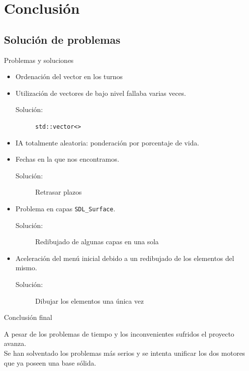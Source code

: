 \documentclass[9pt,xcolor=svgnames]{beamer}
\begin{document}
  


 \section{Conclusión}
 
  \subsection{Solución de problemas}

  \begin{frame}{Problemas y soluciones}
   \transdissolve

   \begin{itemize}
    \item Ordenación del vector en los turnos
    \item Utilización de vectores de bajo nivel fallaba varias
     veces.
	  \begin{description}
	   \item[Solución:] \texttt{std::vector<>}
	  \end{description}
    \item IA totalmente aleatoria: ponderación por porcentaje de vida.
    \item Fechas en la que nos encontramos.
	  \begin{description}
	   \item[Solución:] Retrasar plazos
	  \end{description}
    \item Problema en capas \texttt{SDL\_Surface}.
	  \begin{description}
	   \item[Solución:] Redibujado de algunas capas en una
		       sola
	  \end{description}
    \item Aceleración del menú inicial debido a un redibujado de los
	  elementos del mismo.	  
	  \begin{description}
	   \item[Solución:] Dibujar los elementos una única vez
	  \end{description}
   \end{itemize}

  
  \end{frame}

  \begin{frame}{Conclusión final}
   \transdissolve

   A pesar de los problemas de tiempo y los inconvenientes sufridos el
   proyecto avanza.\\
   \vspace*{0.3cm}
   Se han solventado los problemas más serios y se intenta unificar los
   dos motores que ya poseen una base sólida.
  \end{frame}
  
\end{document}
